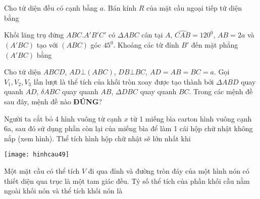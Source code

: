 \begin{question}%
Cho tứ diện đều có cạnh bằng $a$. Bán kính $R$ của mặt cầu ngoại tiếp tứ diện bằng
\vspace{0.2cm}
\datcot
\bonpa
{}
{}
{}
{}
\end{question}

\begin{question}%
Khối lăng trụ đứng $ABC.A'B'C'$ có $\Delta ABC$ cân tại $A$, $\widehat{CAB}=120^0$, $AB=2a$ và $(A'BC)$ tạo với $(ABC)$ góc $45^0$. Khoảng các từ đỉnh $B'$ đến mặt phẳng $(A'BC)$ bằng
\vspace{0.2cm}
\datcot
\bonpa
{}
{}
{}
{}
\end{question}

\begin{question}%
Cho tứ diện $ABCD$, $AD\bot (ABC)$, $DB\bot BC$, $AD=AB=BC=a$. Gọi $V_1, V_2, V_3$ lần lượt là thể tích của khối tròn xoay được tạo thành bởi $\Delta ABD$ quay quanh $AD$, $\delta ABC$ quay quanh $AB$, $\Delta DBC$ quay quanh $BC$. Trong các mệnh đề sau đây, mệnh đề nào \textbf{ĐÚNG}?
\vspace{0.2cm}
\datcot
\bonpa
{}
{}
{}
{}
\end{question}

\begin{question}%
Người ta cắt bỏ 4 hình vuông từ cạnh $x$ từ 1 miếng bìa carton hình vuông cạnh 6a, sau đó sử dụng phần còn lại của miếng bìa để làm 1 cái hộp chữ nhật không nắp (xem hình). Thể tích hình hộp chữ nhật sẽ lớn nhất khi 
\begin{center}
\texttt{[image: hinhcau49]}
\end{center}
\vspace{0.2cm}
\datcot
\bonpa
{}
{}
{}
{}
\end{question}

\begin{question}%
Một mặt cầu có thể tích $V$ đi qua đỉnh và đường tròn đáy của một hình nón có thiết diện qua trục là một tam giác đều. Tỷ số thể tích của phần khối cầu nằm ngoài khối nón và thể tích khối nón là
\vspace{0.2cm}
\datcot
\bonpa
{}
{}
{}
{}
\end{question}
